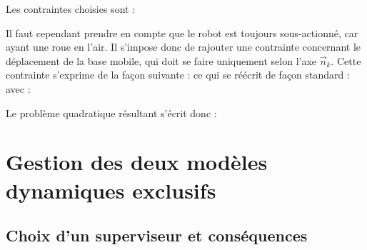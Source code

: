 			Les contraintes choisies sont :
			
			Il faut cependant prendre en compte que le robot est toujours sous-actionné, car ayant une roue en l'air. 
			Il s'impose donc de rajouter une contrainte concernant le déplacement de la base mobile, qui doit se faire uniquement selon l'axe $\vec{n}_k$.
			Cette contrainte s'exprime de la façon suivante :
			ce qui se réécrit de façon standard :
					avec :

			Le problème quadratique résultant s'écrit donc :
			

	\section{Gestion des deux modèles dynamiques exclusifs}
		\label{section.superviseur}
		\subsection{Choix d'un superviseur et conséquences}
		
